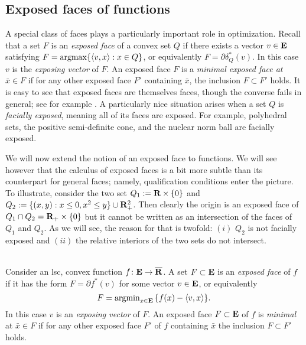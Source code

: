 \documentclass[smallextended,numbook]{svjour3}
\begin{document}
\subsection{Exposed faces of functions}
A special class of faces plays a particularly important role in optimization. Recall that a set $F$ is an {\em exposed face} of a  convex set $Q$ if there exists a vector $v\in{{\bf E}}$ satisfying $F={\operatornamewithlimits{argmax}} \{\langle v,x\rangle: x\in Q\}$, or equivalently
$F=\partial \delta^{*}_Q(v)$. In this case $v$ is the {\em exposing vector} of $F$. An exposed face $F$ is a {\em minimal exposed face at} $\bar{x}\in F$ if for any other exposed face $F'$ containing $\bar{x}$, the inclusion $F\subset F'$ holds. It is easy to see that exposed faces are themselves faces, though the converse fails in general; see for example \cite[Section 19]{con_ter}. A particularly nice situation arises when a set $Q$ is {\em facially exposed}, meaning all of its faces are exposed. For example, polyhedral sets, the positive semi-definite cone, and the nuclear norm ball are facially exposed.

We will now extend the notion of an exposed face to functions. We will see however that the calculus of exposed faces is a bit more subtle than its counterpart for general faces; namely, qualification conditions enter the picture.  To illustrate, consider the two set $Q_1:={{\bf R}}\times \{0\}$ and $Q_2:=\{(x,y): x\leq 0, x^2\leq y\}\cup {{\bf R}}^2_{+}$. Then clearly the origin is an exposed face of $Q_1\cap Q_2={{\bf R}}_+\times\{0\}$ but it cannot be written as an intersection of the faces of $Q_1$ and $Q_2$. As we will see, the reason for that is twofold: $(i)$ $Q_2$  is not facially exposed and $(ii)$ the relative interiors of the two sets do not intersect.
\begin{defn}{\hfill \\}
{\rm Consider an lsc, convex function $f\colon{{\bf E}}\to\overline{{\bf R}}$.
A set $F\subset {{\bf E}}$ is an {\em exposed face} of $f$ if it has the form
$F=\partial f^{*}(v)$ for some vector $v\in{{\bf E}}$, or equivalently
 $$F={\operatornamewithlimits{argmin}}_{x\in {{\bf E}}}\, \{f(x)-\langle v,x\rangle\}.$$ In this case $v$ is an {\em exposing vector} of $F$.
An exposed face $F\subset{{\bf E}}$ of $f$ is {\em minimal}  at $\bar{x}\in F$ if for any other exposed face $F'$ of $f$ containing $\bar{x}$ the inclusion $F\subset F'$ holds. 
}
\end{defn}
 
\end{document}
